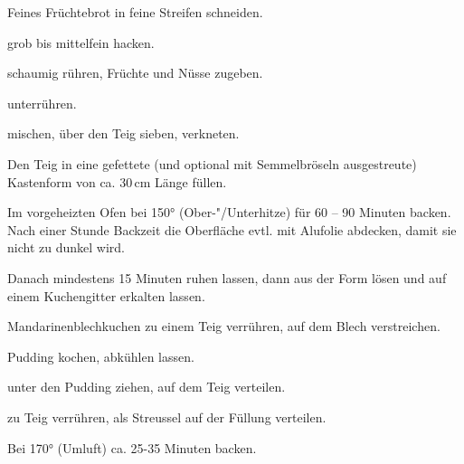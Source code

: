 \begin{recipe}{Feines Früchtebrot}
  in feine Streifen schneiden.
  
  grob bis mittelfein hacken.
  
  schaumig rühren, Früchte und Nüsse zugeben.
  
  unterrühren.
  
  mischen, über den Teig sieben, verkneten.

  Den Teig in eine gefettete (und optional mit Semmelbröseln
  ausgestreute) Kastenform von ca. 30\,cm Länge füllen.
  
  Im vorgeheizten Ofen bei 150° (Ober-"/Unterhitze) für 60 -- 90 Minuten
  backen. Nach einer Stunde Backzeit die Oberfläche evtl. mit Alufolie
  abdecken, damit sie nicht zu dunkel wird.

  Danach mindestens 15 Minuten ruhen lassen, dann aus der Form lösen und
  auf einem Kuchengitter erkalten lassen.
\end{recipe}


\begin{recipe}{Mandarinenblechkuchen}
  zu einem Teig verrühren, auf dem Blech verstreichen.
  
  Pudding kochen, abkühlen lassen.
  
  unter den Pudding ziehen, auf dem Teig verteilen.
  
  zu Teig verrühren, als Streussel auf der Füllung verteilen.
  
  Bei 170° (Umluft) ca. 25-35 Minuten backen.  
\end{recipe}
